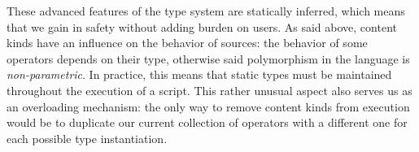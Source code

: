 These advanced features of the type system are statically inferred, which means
that we gain in safety without adding burden on users. As said above, content
kinds have an influence on the behavior of sources: the behavior of some
operators depends on their type, otherwise said polymorphism in the language is
\emph{non-parametric}. In practice, this means that static types must be
maintained throughout the execution of a script. This rather unusual aspect also
serves us as an overloading mechanism: the only way to remove content kinds from
execution would be to duplicate our current collection of operators with a
different one for each possible type instantiation.

